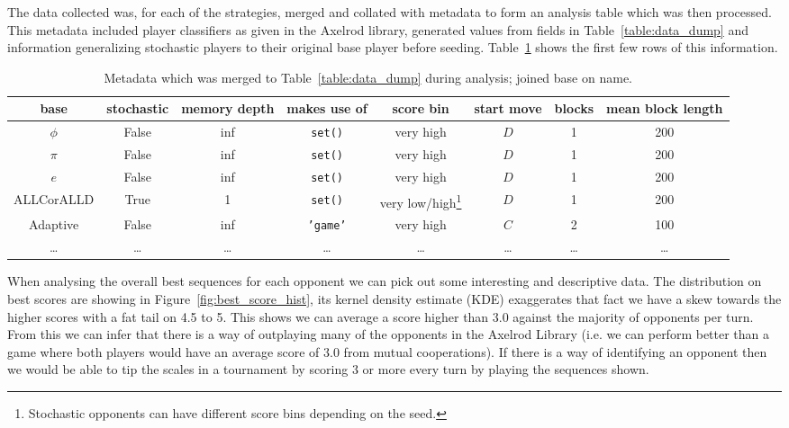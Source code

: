 The data collected was, for each of the strategies, merged and collated with metadata to form an analysis table which was then processed.
This metadata included player classifiers as given in the Axelrod library, generated values from fields in Table~\ref{table:data_dump} and information generalizing stochastic players to their original base player before seeding.
Table~\ref{table:meta_data} shows the first few rows of this information.

\begin{table}[ht]
    \centering
    \begin{tabular}{cccccccc}
        \toprule
        base & stochastic & memory depth & makes use of & score bin & start move & blocks & mean block length\\
        \midrule
        $\phi$ & False & inf & \texttt{set()} & very high &  $D$ & 1 & 200\\

        $\pi$ & False & inf & \texttt{set()} & very high &  $D$ & 1 & 200\\

        $e$ & False & inf & \texttt{set()} & very high &  $D$ & 1 & 200\\

        ALLCorALLD & True & 1 & \texttt{set()} & very low/high\footnote{Stochastic opponents can have different score bins depending on the seed.} &  $D$ & 1 & 200\\

        Adaptive & False & inf & \texttt{'game'} & very high &  $C$ & 2 & 100\\

        \ldots & \ldots & \ldots & \ldots & \ldots & \ldots & \ldots & \ldots\\    
        \bottomrule
    \end{tabular}
    \caption{Metadata which was merged to Table~\ref{table:data_dump} during analysis; joined base on name.}\label{table:meta_data}
\end{table}

When analysing the overall best sequences for each opponent we can pick out some interesting and descriptive data.
The distribution on best scores are showing in Figure~\ref{fig:best_score_hist}, its kernel density estimate (KDE) \cite{tukey1977exploratory} exaggerates that fact we have a skew towards the higher scores with a fat tail on 4.5 to 5.
This shows we can average a score higher than 3.0 against the majority of opponents per turn.
From this we can infer that there is a way of outplaying many of the opponents in the Axelrod Library (i.e. we can perform better than a game where both players would have an average score of $3.0$ from mutual cooperations).
If there is a way of identifying an opponent then we would be able to tip the scales in a tournament by scoring 3 or more every turn by playing the sequences shown.

